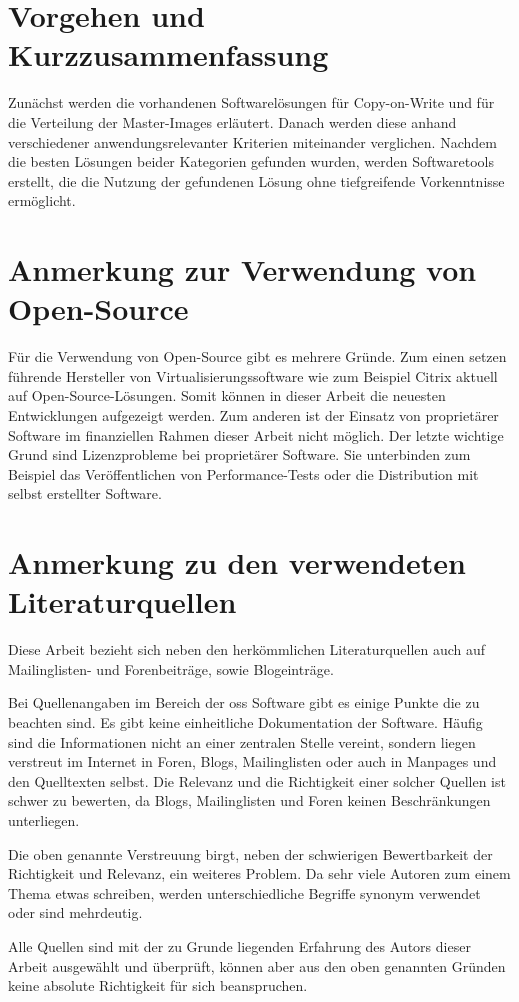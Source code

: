 \section{Vorgehen und Kurzzusammenfassung} 
Zunächst werden die vorhandenen Softwarelösungen für Copy-on-Write und für die Verteilung der Master-Images erläutert. Danach werden diese anhand verschiedener anwendungsrelevanter Kriterien miteinander verglichen. Nachdem die besten Lösungen beider Kategorien gefunden wurden, werden Softwaretools erstellt, die die Nutzung der gefundenen Lösung ohne tiefgreifende Vorkenntnisse ermöglicht.

\section{Anmerkung zur Verwendung von Open-Source}\label{opensource}
Für die Verwendung von Open-Source gibt es mehrere Gründe. Zum einen setzen führende Hersteller von Virtualisierungssoftware wie zum Beispiel Citrix aktuell auf Open-Source-Lösungen. Somit können in dieser Arbeit die neuesten Entwicklungen aufgezeigt werden. Zum anderen ist der Einsatz von proprietärer Software im finanziellen Rahmen dieser Arbeit nicht möglich. Der letzte wichtige Grund sind Lizenzprobleme bei proprietärer Software. Sie unterbinden zum Beispiel das Veröffentlichen von Performance-Tests oder die Distribution mit selbst erstellter Software. 

\section{Anmerkung zu den verwendeten Literaturquellen}
Diese Arbeit bezieht sich neben den herkömmlichen Literaturquellen auch auf Mailinglisten- und Forenbeiträge, sowie Blogeinträge.

Bei Quellenangaben im Bereich der \gls{oss} Software gibt es einige Punkte die zu beachten sind. Es gibt keine einheitliche Dokumentation der Software. Häufig sind die Informationen nicht an einer zentralen Stelle vereint, sondern liegen verstreut im Internet in Foren, Blogs, Mailinglisten oder auch in Manpages und den Quelltexten selbst. Die Relevanz und die Richtigkeit einer solcher Quellen ist schwer zu bewerten, da Blogs, Mailinglisten und Foren keinen Beschränkungen unterliegen. \begin{comment} Das heißt, jeder der Willens ist zu einem Thema etwas zu schreiben, kann dies auch tun. \end{comment} 

Die oben genannte Verstreuung birgt, neben der schwierigen Bewertbarkeit der Richtigkeit und Relevanz, ein weiteres Problem. Da sehr viele Autoren zum einem Thema etwas schreiben, werden unterschiedliche Begriffe synonym verwendet oder sind mehrdeutig.

Alle Quellen sind mit der zu Grunde liegenden Erfahrung des Autors dieser Arbeit ausgewählt und überprüft, können aber aus den oben genannten Gründen keine absolute Richtigkeit für sich beanspruchen.
